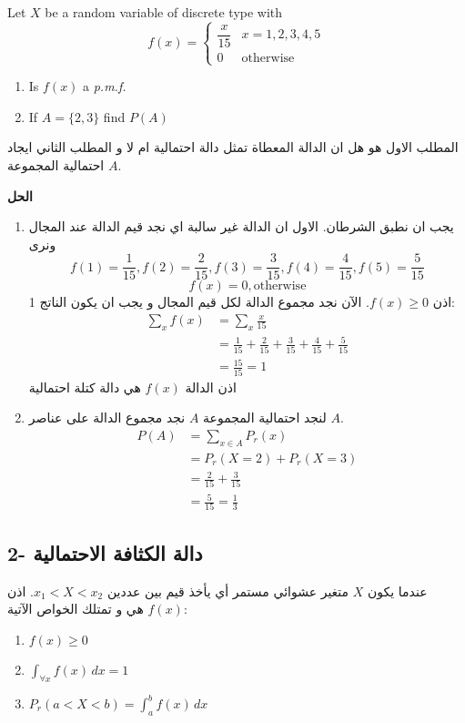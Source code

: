 \begin{example}
	\begin{english}
		Let \(X\) be a random variable of discrete type with
		\[
		f(x) = \begin{cases}
			\dfrac{x}{15} & x=1,2,3,4,5 \\
			0 & \text{otherwise}
		\end{cases} 
		\]
		\begin{enumerate}
			\item Is \(f(x)\) a \textit{p.m.f.}
			\item If \(A=\{2,3\}\) find \(P(A)\)
		\end{enumerate}
	\end{english}
	\noindent
	المطلب الاول هو هل ان الدالة المعطاة تمثل دالة احتمالية ام لا و المطلب الثاني ايجاد احتمالية المجموعة \(A\).
\end{example}
\noindent
\textbf{الحل}
	\begin{enumerate}[topsep=0pt]
		\item  يجب ان نطبق الشرطان. الاول ان الدالة غير سالبة اي نجد قيم الدالة عند المجال ونرى
		\[
		f(1) = \frac{1}{15}, f(2) = \frac{2}{15}, f(3)=\frac{3}{15}, f(4)=\frac{4}{15}, f(5)=\frac{5}{15}
		\]
		\[
		f(x) = 0, \text{otherwise}
		\]
		اذن $f(x)\geq0$. الآن نجد مجموع الدالة لكل قيم المجال و يجب ان يكون الناتج 1:
		\begin{align*}
			\sum_x f(x) &= \sum_x \frac{x}{15}\\
			&= \frac{1}{15} + \frac{2}{15} + \frac{3}{15} + \frac{4}{15} + \frac{5}{15}\\
			&= \frac{15}{15} = 1
		\end{align*}
		اذن الدالة $f(x)$ هي دالة كتلة احتمالية \hspace{10pt}
		
		\item لنجد احتمالية المجموعة \(A\) نجد مجموع الدالة على عناصر \(A\).
		\begin{align*}
			P(A) &= \sum_{x\in A} P_r(x)\\
			&= P_r(X=2) + P_r(X=3)\\
			&= \frac{2}{15}+\frac{3}{15}\\
			&= \frac{5}{15} = \frac{1}{3}
		\end{align*}
	\end{enumerate}

\subsection*{2- دالة الكثافة الاحتمالية }
عندما يكون $X$ متغير عشوائي مستمر أي يأخذ قيم بين عددين $x_1<X<x_2$. اذن $f(x)$ هي  و تمتلك الخواص الآتية:
\begin{enumerate}
	\item \(f(x) \geq 0\)
	\item \(\displaystyle \int_{\forall x}f(x) \, dx = 1\)
	\item \(\displaystyle P_r(a<X<b) = \int_a^b f(x)\, dx\)
\end{enumerate}

